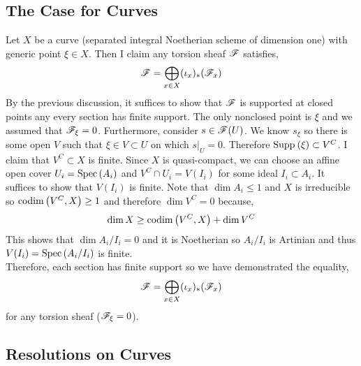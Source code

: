 \documentclass[12pt]{article}
\begin{document}
\subsection{The Case for Curves}

Let $X$ be a curve (separated integral Noetherian scheme of dimension one) with generic point $\xi \in X$. Then I claim any torsion sheaf $\mathscr{F}$ satisfies,
\[ \mathscr{F} = \bigoplus_{x \in X} (\iota_x)_* (\mathscr{F}_x) \]
By the previous discussion, it suffices to show that $\mathscr{F}$ is supported at closed points any every section has finite support. The only nonclosed point is $\xi$ and we assumed that $\mathscr{F}_{\xi} = 0$. Furthermore, consider $s \in \mathscr{F}(U)$. We know $s_{\xi}$ so there is some open $V$ such that $\xi \in V \subset U$ on which $s|_U = 0$. Therefore $\mathrm{Supp}_{} \left( \xi \right) \subset V^C$. I claim that $V^C \subset X$ is finite. Since $X$ is quasi-compact, we can choose an affine open cover $U_i = \mathrm{Spec}\left( A_i \right)$ and $V^C \cap U_i = V(I_i)$ for some ideal $I_i \subset A_i$. It suffices to show that $V(I_i)$ is finite. Note that $\dim{A_i} \le 1$ and $X$ is irreducible so $\mathrm{codim}\left( V^C, X \right) \ge 1$ and therefore $\dim{V^C} = 0$ because,
\[ \dim{X} \ge \mathrm{codim}\left( V^C, X \right) + \dim{V^C} \]
This shows that $\dim{A_i/I_i} = 0$ and it is Noetherian so $A_i / I_i$ is Artinian and thus $V(I_i) = \mathrm{Spec}\left( A_i / I_i \right)$ is finite. 
\bigskip\\
Therefore, each section has finite support so we have demonstrated the equality,
\[ \mathscr{F} = \bigoplus_{x \in X} (\iota_x)_* (\mathscr{F}_x) \]
for any torsion sheaf ($\mathscr{F}_\xi = 0$).

\subsection{Resolutions on Curves}
\end{document}
